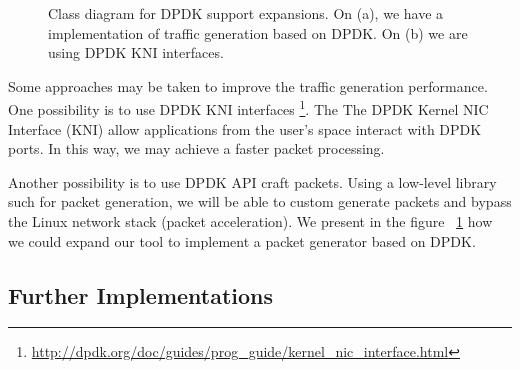 \begin{figure}[h!]
	\centering
	\hspace{0mm}
	\caption{Class diagram for DPDK support expansions. On (a), we have a implementation of traffic generation based on DPDK. On (b) we are using DPDK KNI interfaces.}
	\label{fig:DpdkFlow}
\end{figure}

Some approaches may be taken to improve the traffic generation performance. One possibility is to use DPDK KNI interfaces \footnote{\href{http://dpdk.org/doc/guides/prog_guide/kernel_nic_interface.html}{http://dpdk.org/doc/guides/prog\_guide/kernel\_nic\_interface.html}}. The The DPDK Kernel NIC Interface (KNI) allow applications from the user's space interact with DPDK ports. In this way, we may achieve a faster packet processing. 

Another possibility is to use DPDK API craft packets. Using a low-level library such for packet generation, we will be able to custom generate packets and bypass the Linux network stack (packet acceleration). We present in the figure ~\ref{fig:DpdkFlow} how we could expand our tool to implement a packet generator based on DPDK.





\subsection{Further Implementations}


